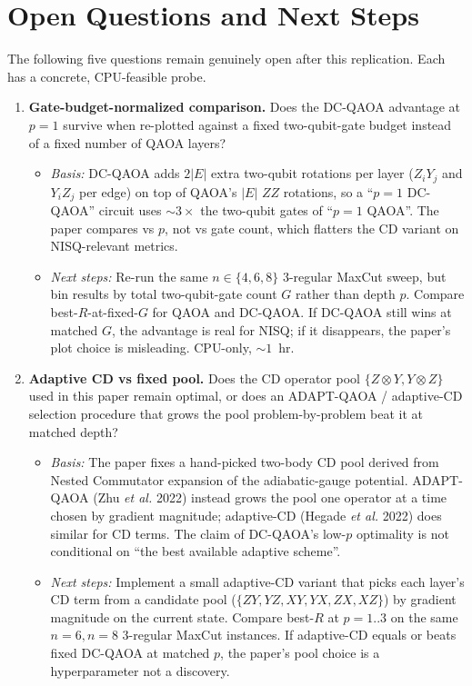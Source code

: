 \section{Open Questions and Next Steps}
\label{sec:open-questions}

The following five questions remain genuinely open after this replication. Each has a concrete, CPU-feasible probe.

\begin{enumerate}
  \item \textbf{Gate-budget-normalized comparison.} Does the DC-QAOA advantage at $p=1$ survive when re-plotted against a fixed two-qubit-gate budget instead of a fixed number of QAOA layers?
  \begin{itemize}
    \item \emph{Basis:} DC-QAOA adds $2|E|$ extra two-qubit rotations per layer ($Z_iY_j$ and $Y_iZ_j$ per edge) on top of QAOA's $|E|$ $ZZ$ rotations, so a ``$p=1$ DC-QAOA'' circuit uses ${\sim}3\times$ the two-qubit gates of ``$p=1$ QAOA''. The paper compares vs $p$, not vs gate count, which flatters the CD variant on NISQ-relevant metrics.
    \item \emph{Next steps:} Re-run the same $n\in\{4,6,8\}$ 3-regular MaxCut sweep, but bin results by total two-qubit-gate count $G$ rather than depth $p$. Compare best-$R$-at-fixed-$G$ for QAOA and DC-QAOA. If DC-QAOA still wins at matched $G$, the advantage is real for NISQ; if it disappears, the paper's plot choice is misleading. CPU-only, ${\sim}1$~hr.
  \end{itemize}

  \item \textbf{Adaptive CD vs fixed pool.} Does the CD operator pool $\{Z\otimes Y, Y\otimes Z\}$ used in this paper remain optimal, or does an ADAPT-QAOA / adaptive-CD selection procedure that grows the pool problem-by-problem beat it at matched depth?
  \begin{itemize}
    \item \emph{Basis:} The paper fixes a hand-picked two-body CD pool derived from Nested Commutator expansion of the adiabatic-gauge potential. ADAPT-QAOA (Zhu \emph{et al.} 2022) instead grows the pool one operator at a time chosen by gradient magnitude; adaptive-CD (Hegade \emph{et al.} 2022) does similar for CD terms. The claim of DC-QAOA's low-$p$ optimality is not conditional on ``the best available adaptive scheme''.
    \item \emph{Next steps:} Implement a small adaptive-CD variant that picks each layer's CD term from a candidate pool ($\{ZY, YZ, XY, YX, ZX, XZ\}$) by gradient magnitude on the current state. Compare best-$R$ at $p=1..3$ on the same $n=6, n=8$ 3-regular MaxCut instances. If adaptive-CD equals or beats fixed DC-QAOA at matched $p$, the paper's pool choice is a hyperparameter not a discovery.
  \end{itemize}


\end{enumerate}
